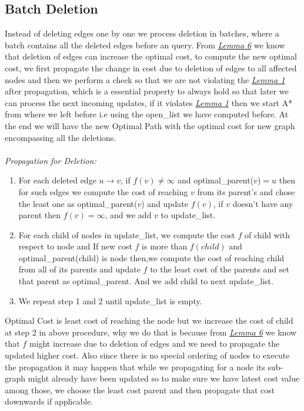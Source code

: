 \documentclass[a4paper]{article}
\begin{document}
\subsection{Batch Deletion}
Instead of deleting edges one by one we process deletion in batches, where a batch contains all the deleted edges before an query. From \hyperlink{Lemma 6}{\textit{Lemma 6}} we know that deletion of edges can increase the optimal cost, to compute the new optimal cost, we first propagate the change in cost due to deletion of edges to all affected nodes and then we perform a check so that we  are not violating the \hyperlink{Lemma 1}{\textit{Lemma 1}} after propagation, which is a essential property to always hold so that later we can process the next incoming updates, if it violates \hyperlink{Lemma 1}{\textit{Lemma 1}} then we start A* from where we left before i.e using the open\_list we have computed before. At the end we will have the new Optimal Path with the optimal cost for new graph encompassing all the deletions.\\
\\
\textit{Propagation for Deletion:}
\begin{enumerate}
    \item For each deleted edge $u \rightarrow v$, if $f(v) \neq \infty$ and optimal\_parent($v$)$=u$ then for such edges we compute the cost of reaching $v$ from its parent's and chose the least one as optimal\_parent($v$) and update $f(v)$, if $v$ doesn't have any parent then $f(v)=\infty$, and we add $v$ to update\_list.
    
    \item For each child of nodes in update\_list, we compute the cost $f$ of child with respect to node and If new cost $f$ is more than $f(child)$ and optimal\_parent(child)  is node then,we compute the cost of reaching child from all of its parents and update $f$ to the least cost of the parents and set that parent as optimal\_parent. And we add child to next update\_list.
    
    \item We repeat step 1 and 2 until update\_list is empty.
\end{enumerate}
Optimal Cost is least cost of reaching the node but we increase the cost of child at step 2 in above procedure, why we do that is because from \hyperlink{Lemma 6}{\textit{Lemma 6}} we know that $f$ might increase due to deletion of edges and we need to propagate the updated higher cost. Also since there is no special ordering of nodes to execute the propagation it may happen that while we propagating for a node its sub-graph might already have been updated so to make sure we have latest cost value among those, we choose the least cost parent and then propagate that cost downwards if applicable.
\end{document}
